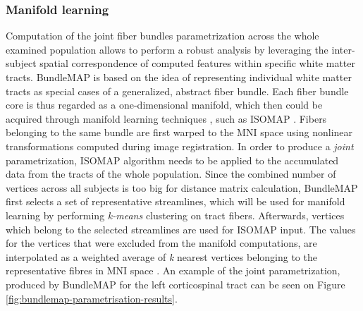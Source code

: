 \documentclass[thesis.tex]{subfiles}
\begin{document}
\subsubsection{Manifold learning}
Computation of the joint fiber bundles parametrization across the whole examined population allows to perform a robust analysis by leveraging the inter-subject spatial correspondence of computed features within specific white matter tracts.
BundleMAP is based on the idea of representing individual white matter tracts as special cases of a generalized, abstract fiber bundle. Each fiber bundle core is thus regarded as a one-dimensional manifold, which then could be acquired through manifold learning techniques \cite{Khatami2017BundleMap}, such as ISOMAP \cite{isomapTenenbaum}. Fibers belonging to the same bundle are first warped to the MNI space using nonlinear transformations computed during image registration. In order to produce a \textit{joint} parametrization, ISOMAP algorithm needs to be applied to the accumulated data from the tracts of the whole population. Since the combined number of vertices across all subjects is too big for distance matrix calculation, BundleMAP first selects a set of representative streamlines, which will be used for manifold learning by performing \textit{k-means} clustering on tract fibers. Afterwards, vertices which belong to the selected streamlines are used for ISOMAP input. The values for the vertices that were excluded from the manifold computations, are interpolated as a weighted average of \textit{k} nearest vertices belonging to the representative fibres in MNI space \cite{Khatami2017BundleMap}. An example of the joint parametrization, produced by BundleMAP for the left corticospinal tract can be seen on Figure \ref{fig:bundlemap-parametrisation-results}.
\end{document}
